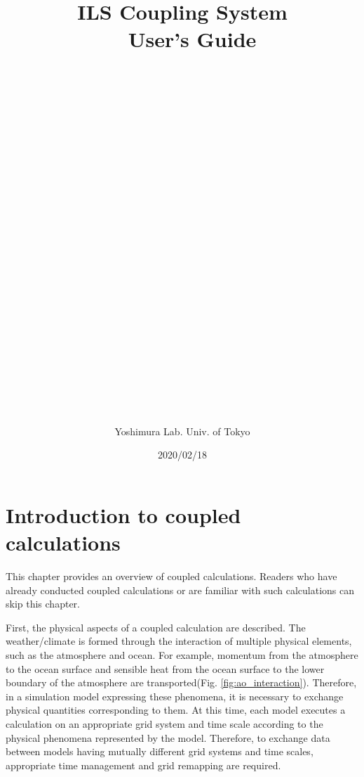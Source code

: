 \documentclass[11pt,a4paper]{report}
\newcommand{\figref}[1]{Fig. \ref{#1}}
\begin{document}
\title{
ILS Coupling System\\
　User's Guide\\
　\\
　\\
　\\
　\\
　\\
　\\
　\\
　\\
　\\
　\\
　\\
　\\
　\\
}

\date{2020/02/18}

\author{Yoshimura Lab. Univ. of Tokyo}



\maketitle
\tableofcontents


\chapter{Introduction to coupled calculations}
This chapter provides an overview of coupled calculations.
Readers who have already conducted coupled calculations or are familiar with such calculations can skip this chapter.

First, the physical aspects of a coupled calculation are described.
The weather/climate is formed through the interaction of multiple physical elements, such as the atmosphere and ocean.
For example, momentum from the atmosphere to the ocean surface and sensible heat from the ocean surface to the lower boundary of the atmosphere are transported(\figref{fig:ao_interaction}).
Therefore, in a simulation model expressing these phenomena, it is necessary to exchange physical quantities corresponding to them.
At this time, each model executes a calculation on an appropriate grid system and time scale according to the physical phenomena represented by the model.
Therefore, to exchange data between models having mutually different grid systems and time scales, appropriate time management and grid remapping are required.
\end{document}
